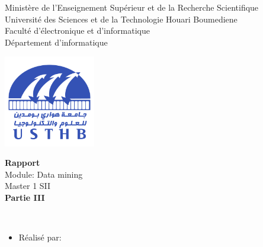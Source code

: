 \documentclass[12pt , a4paper]{report}
\begin{document}
\begin{center}
\normalsize{Ministère de l'Enseignement Supérieur et de la Recherche Scientifique}\\
\normalsize{Université des Sciences et de la Technologie Houari Boumediene}\\
\normalsize{Faculté d'électronique et d'informatique}\\
\normalsize{Département d'informatique}\\
\end{center}
\begin{center}
\includegraphics[width=4cm,height=4cm]{usthb.png}
\end{center}

\begin{center}
\Huge{\textbf{Rapport}}\\
\vspace{0.7cm}
\large{Module: Data mining}\\
\vspace{0.2cm}
\large{Master 1 SII}\\
\vspace{1.5cm}
\normalsize{\textbf{Partie III}}
\end{center}
\vspace{3cm}
\\
\begin{itemize}
    \item{Réalisé par:}
\end{itemize}

\vspace{3cm}
\end{document}

